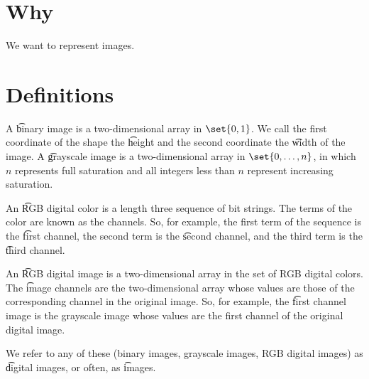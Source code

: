
\section*{Why}

We want to represent images.

\section*{Definitions}

A \t{binary image} is a two-dimensional array in $\set{0, 1}$.
We call the first coordinate of the shape the \t{height} and the second coordinate the \t{width} of the image.
A \t{grayscale image} is a two-dimensional array in $\set{0, \dots , n}$, in which $n$ represents full saturation and all integers less than $n$ represent increasing saturation.

An \t{RGB digital color} is a length three sequence of bit strings.
The terms of the color are known as the channels.
So, for example, the first term of the sequence is the \t{first channel}, the second term is the \t{second channel}, and the third term is the \t{third channel}.

An \t{RGB digital image} is a two-dimensional array in the set of RGB digital colors.
The \t{image channels} are the two-dimensional array whose values are those of the corresponding channel in the original image.
So, for example, the \t{first channel image} is the grayscale image whose values are the first channel of the original digital image.

We refer to any of these (binary images, grayscale images, RGB digital images) as \t{digital images}, or often, as \t{images}.

\blankpage